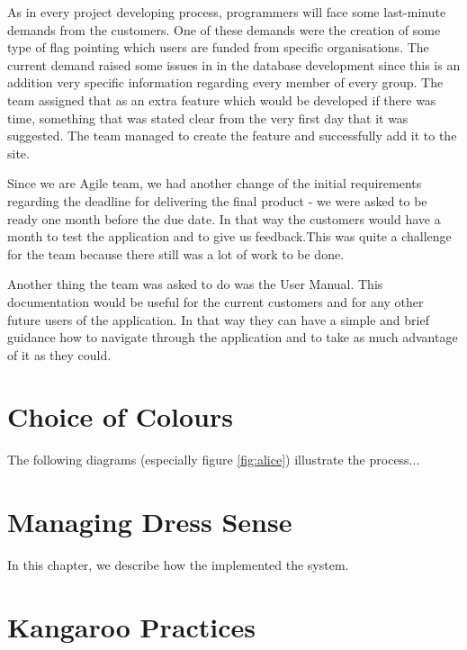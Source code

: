 \documentclass{l3proj}
\begin{document}
As in every project developing process, programmers will face some last-minute demands from the customers. One of these demands were the creation of some type of flag pointing which users are funded from specific organisations. The current demand raised some issues in in the database development since this is an addition very specific information regarding every member of every group. The team assigned that as an extra feature which would be developed if there was time, something that was stated clear from the very first day that it was suggested. The team managed to create the feature and successfully add it to the site.

Since we are Agile team, we had another change of the initial requirements regarding the deadline for delivering the final product - we were asked to be ready one month before the due date. In that way the customers would have a month to test the application and to give us feedback.This was quite a challenge for the team because there still was a lot of work to be done. 

Another thing the team was asked to do was the User Manual. This documentation would be useful for the current customers and for any other future users of the application. In that way they can have a simple and brief guidance how to navigate through the application and to take as much advantage of it as they could.



\section{Choice of Colours}
\label{design}

The following diagrams (especially figure \ref{fig:alice}) illustrate the
process...

\section{Managing Dress Sense}
\label{managing}

In this chapter, we describe how the implemented the system.

\section{Kangaroo Practices}
\end{document}
